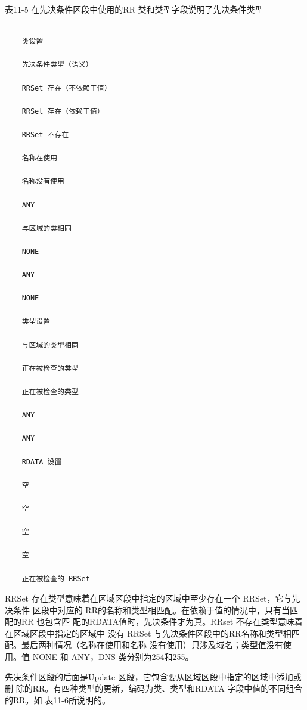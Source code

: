 表11-5 在先决条件区段中使用的RR 类和类型字段说明了先决条件类型
\begin{verbatim}

    类设置

    先决条件类型（语义）

    RRSet 存在（不依赖于值）

    RRSet 存在（依赖于值）

    RRSet 不存在

    名称在使用

    名称没有使用

    ANY

    与区域的类相同

    NONE

    ANY

    NONE

    类型设置

    与区域的类型相同

    正在被检查的类型

    正在被检查的类型

    ANY

    ANY

    RDATA 设置

    空

    空

    空

    空

    正在被检查的 RRSet
\end{verbatim}

RRSet 存在类型意味着在区域区段中指定的区域中至少存在一个 RRSet，它与先决条件
区段中对应的 RR的名称和类型相匹配。在依赖于值的情况中，只有当匹配的RR 也包含匹
配的RDATA值时，先决条件才为真。RRset 不存在类型意味着在区域区段中指定的区域中
没有 RRSet 与先决条件区段中的RR名称和类型相匹配。最后两种情况（名称在使用和名称
没有使用）只涉及域名；类型值没有使用。值 NONE 和 ANY，DNS 类分别为254和255。

先决条件区段的后面是Update 区段，它包含要从区域区段中指定的区域中添加或删
除的RR。有四种类型的更新，编码为类、类型和RDATA 字段中值的不同组合的RR，如
表11-6所说明的。

